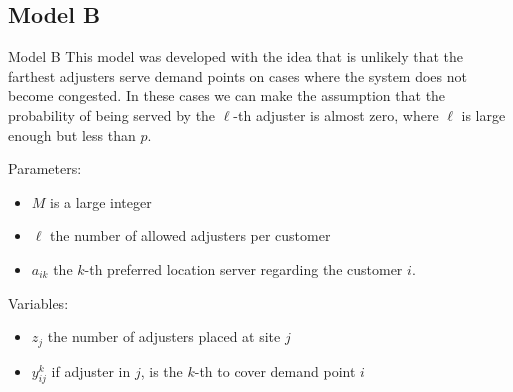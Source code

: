 
\subsection{Model B}
  
\begin{frame}{Model B}
  This model was developed with the idea that is unlikely that
  the farthest adjusters serve demand points on cases where the system does not become congested.
  In these cases we can make the assumption that the probability of being served by the $\ell$-th 
  adjuster is almost zero, where $\ell$ is large enough but less than $p$.

  Parameters:
  \begin{itemize}
  \item $M$ is a large integer
  \item $\ell$ the number of allowed adjusters per customer
  \item $a_{ik}$ the $k$-th preferred location server regarding the customer $i$.
  \end{itemize}

  Variables:
  \begin{itemize}
  \item $z_j$ the number of adjusters placed at site $j$
  \item $y_{ij}^k$ if adjuster in $j$, is the $k$-th to cover demand point $i$
  \end{itemize}

\end{frame}

